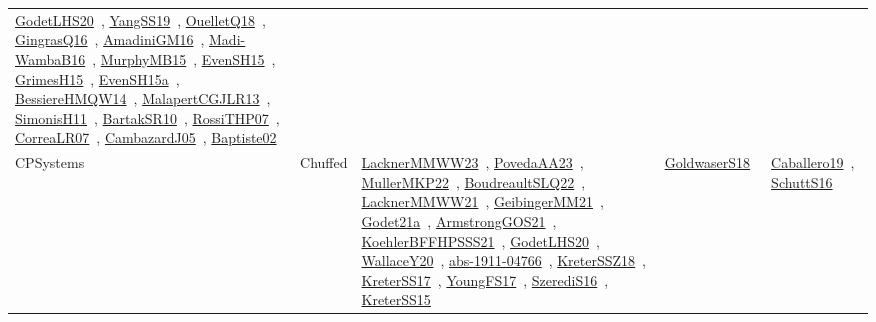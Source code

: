 {\begin{longtable}{lp{3cm}>{\raggedright\arraybackslash}p{6cm}>{\raggedright\arraybackslash}p{6cm}>{\raggedright\arraybackslash}p{8cm}}
\href{../works/GodetLHS20.pdf}{GodetLHS20}~\cite{GodetLHS20}, \href{../works/YangSS19.pdf}{YangSS19}~\cite{YangSS19}, \href{../works/OuelletQ18.pdf}{OuelletQ18}~\cite{OuelletQ18}, \href{../works/GingrasQ16.pdf}{GingrasQ16}~\cite{GingrasQ16}, \href{../works/AmadiniGM16.pdf}{AmadiniGM16}~\cite{AmadiniGM16}, \href{../works/Madi-WambaB16.pdf}{Madi-WambaB16}~\cite{Madi-WambaB16}, \href{../works/MurphyMB15.pdf}{MurphyMB15}~\cite{MurphyMB15}, \href{../works/EvenSH15.pdf}{EvenSH15}~\cite{EvenSH15}, \href{../works/GrimesH15.pdf}{GrimesH15}~\cite{GrimesH15}, \href{../works/EvenSH15a.pdf}{EvenSH15a}~\cite{EvenSH15a}, \href{../works/BessiereHMQW14.pdf}{BessiereHMQW14}~\cite{BessiereHMQW14}, \href{../works/MalapertCGJLR13.pdf}{MalapertCGJLR13}~\cite{MalapertCGJLR13}, \href{../works/SimonisH11.pdf}{SimonisH11}~\cite{SimonisH11}, \href{../works/BartakSR10.pdf}{BartakSR10}~\cite{BartakSR10}, \href{../works/RossiTHP07.pdf}{RossiTHP07}~\cite{RossiTHP07}, \href{../works/CorreaLR07.pdf}{CorreaLR07}~\cite{CorreaLR07}, \href{../works/CambazardJ05.pdf}{CambazardJ05}~\cite{CambazardJ05}, \href{../works/Baptiste02.pdf}{Baptiste02}~\cite{Baptiste02}\\
CPSystems & Chuffed & \href{../works/LacknerMMWW23.pdf}{LacknerMMWW23}~\cite{LacknerMMWW23}, \href{../works/PovedaAA23.pdf}{PovedaAA23}~\cite{PovedaAA23}, \href{../works/MullerMKP22.pdf}{MullerMKP22}~\cite{MullerMKP22}, \href{../works/BoudreaultSLQ22.pdf}{BoudreaultSLQ22}~\cite{BoudreaultSLQ22}, \href{../works/LacknerMMWW21.pdf}{LacknerMMWW21}~\cite{LacknerMMWW21}, \href{../works/GeibingerMM21.pdf}{GeibingerMM21}~\cite{GeibingerMM21}, \href{../works/Godet21a.pdf}{Godet21a}~\cite{Godet21a}, \href{../works/ArmstrongGOS21.pdf}{ArmstrongGOS21}~\cite{ArmstrongGOS21}, \href{../works/KoehlerBFFHPSSS21.pdf}{KoehlerBFFHPSSS21}~\cite{KoehlerBFFHPSSS21}, \href{../works/GodetLHS20.pdf}{GodetLHS20}~\cite{GodetLHS20}, \href{../works/WallaceY20.pdf}{WallaceY20}~\cite{WallaceY20}, \href{../works/abs-1911-04766.pdf}{abs-1911-04766}~\cite{abs-1911-04766}, \href{../works/KreterSSZ18.pdf}{KreterSSZ18}~\cite{KreterSSZ18}, \href{../works/KreterSS17.pdf}{KreterSS17}~\cite{KreterSS17}, \href{../works/YoungFS17.pdf}{YoungFS17}~\cite{YoungFS17}, \href{../works/SzerediS16.pdf}{SzerediS16}~\cite{SzerediS16}, \href{../works/KreterSS15.pdf}{KreterSS15}~\cite{KreterSS15} & \href{../works/GoldwaserS18.pdf}{GoldwaserS18}~\cite{GoldwaserS18} & \href{../works/Caballero19.pdf}{Caballero19}~\cite{Caballero19}, \href{../works/SchuttS16.pdf}{SchuttS16}~\cite{SchuttS16}\\

\end{longtable}}
